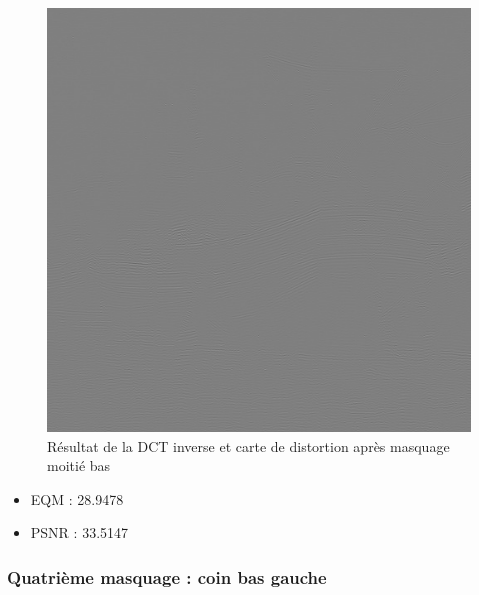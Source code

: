 \documentclass[12pt]{report}
\begin{document}
\begin{figure}[H]
\begin{center}
\includegraphics[scale=0.4]{../ImageRes/idct_masked2_disto.jpg} 
\caption{Résultat de la DCT inverse et carte de distortion après masquage moitié bas}
\end{center}
\end{figure}

\begin{itemize}
\item EQM : 28.9478
\item PSNR : 33.5147
\end{itemize}

\subsubsection{Quatrième masquage : coin bas gauche}
\end{document}
